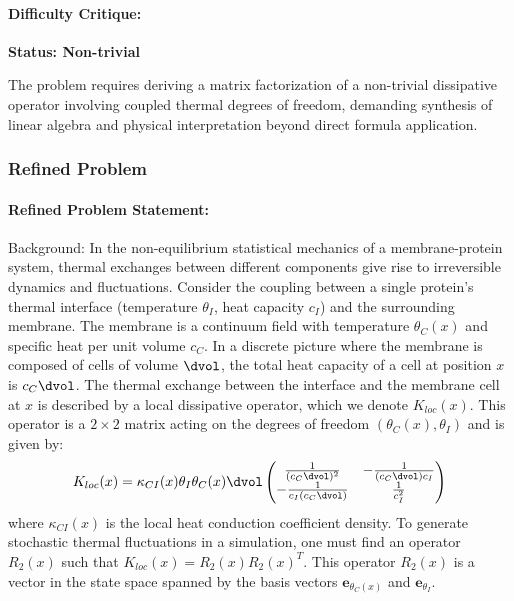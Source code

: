 \documentclass[10pt]{article}
\begin{document}
\paragraph*{Difficulty Critique:}
\textcolor{pass}{\textbf{Status: Non-trivial}}

The problem requires deriving a matrix factorization of a non-trivial dissipative operator involving coupled thermal degrees of freedom, demanding synthesis of linear algebra and physical interpretation beyond direct formula application.


\subsubsection*{Refined Problem}
\paragraph*{Refined Problem Statement:}
Background:
In the non-equilibrium statistical mechanics of a membrane-protein system, thermal exchanges between different components give rise to irreversible dynamics and fluctuations. Consider the coupling between a single protein's thermal interface (temperature $\theta_I$, heat capacity $c_I$) and the surrounding membrane. The membrane is a continuum field with temperature $\theta_C(x)$ and specific heat per unit volume $c_C$. In a discrete picture where the membrane is composed of cells of volume $\dvol$, the total heat capacity of a cell at position $x$ is $c_C \dvol$. The thermal exchange between the interface and the membrane cell at $x$ is described by a local dissipative operator, which we denote $K_{loc}(x)$. This operator is a $2 \times 2$ matrix acting on the degrees of freedom $(\theta_C(x), \theta_I)$ and is given by:
\begin{equation*}
K_{loc}(x) = \kappa_{CI}(x)\theta_I\theta_C(x)\dvol \begin{pmatrix} \frac{1}{(c_C \dvol)^2} & -\frac{1}{(c_C \dvol) c_I} \\ -\frac{1}{c_I (c_C \dvol)} & \frac{1}{c_I^2} \end{pmatrix}
\end{equation*}
where $\kappa_{CI}(x)$ is the local heat conduction coefficient density. To generate stochastic thermal fluctuations in a simulation, one must find an operator $R_2(x)$ such that $K_{loc}(x) = R_2(x) R_2(x)^T$. This operator $R_2(x)$ is a vector in the state space spanned by the basis vectors $\mathbf{e}_{\theta_C(x)}$ and $\mathbf{e}_{\theta_I}$.
\end{document}

